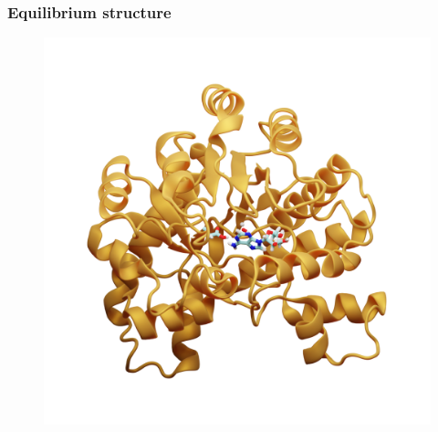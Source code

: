 \documentclass{beamer}
\begin{document}
\begin{frame}
\frametitle{Equilibrium structure}
\begin{figure}
\includegraphics[scale=0.23]{figures/ada-equil.png}
\end{figure}
\end{frame}
\end{document}

